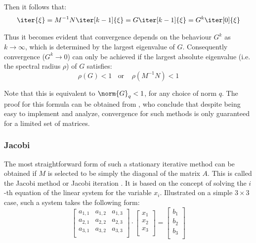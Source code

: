 \noindent Then it follows that:
\begin{equation}
    \iter{\xi} = M^{-1}N\iter[k-1]{\xi} = G\iter[k-1]{\xi}=G^k\iter[0]{\xi}
\end{equation}

\noindent Thus it becomes evident that convergence depends on the behaviour $G^k$ as $k \rightarrow \infty$, which is determined by the largest eigenvalue of $G$. Consequently convergence ($G^k \rightarrow 0$) can only be achieved if the largest absolute eigenvalue (i.e. the spectral radius $\rho$) of $G$ satisfies:
\begin{equation}
\label{eqn:convergence}
    \rho(G) < 1 \;\;\text{ or }\;\;\ \rho(M^{-1}N)<1 
\end{equation}

\noindent Note that this is equivalent to $\norm{G}_q<1$, for any choice of norm $q$. The proof for this formula can be obtained from \cite{golub_matrix_2013}, who conclude that despite being easy to implement and analyze, convergence for such methods is only guaranteed for a limited set of matrices.

\subsubsection{Jacobi}
The most straightforward form of such a stationary iterative method can be obtained if $M$ is selected to be simply the diagonal of the matrix $A$. This is called the Jacobi method or Jacobi iteration \cite{golub_matrix_2013}. It is based on the concept of solving the $i$-th equation of the linear system for the variable $x_i$. Illustrated on a simple $3 \times 3$ case, such a system takes the following form:
\begin{equation}
  \left[
    \begin{array}{ccc}
      a_{1,1} & a_{1,2} & a_{1,3} \\
      a_{2,1} & a_{2,2} & a_{2,3} \\
      a_{3,1} & a_{3,2} & a_{3,3} \\
    \end{array}
  \right] \cdot
  \left[
    \begin{array}{c}
      x_{1} \\
      x_{2} \\
      x_{3}  \\
    \end{array}
  \right] = 
  \left[
    \begin{array}{c}
      b_{1} \\
      b_{2} \\
      b_{3}  \\
    \end{array}
  \right] 
\end{equation}

